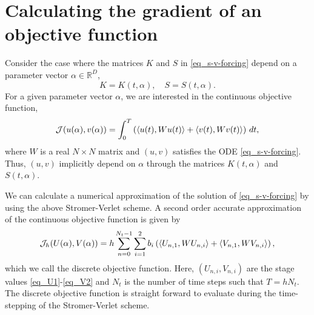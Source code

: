 \documentclass[11pt]{article}
\begin{document}
\section{Calculating the gradient of an objective function}

Consider the case where the matrices $K$ and $S$ in \eqref{eq_s-v-forcing} depend on a parameter
vector $\alpha \in {\mathbb R}^D$,
\[
K = K(t,\alpha),\quad S = S(t,\alpha).
\]
For a given parameter vector $\alpha$, we are interested in the continuous objective function,
\[
{\cal J}(u(\alpha), v(\alpha)) = \int_{0}^T \left( \langle u(t),W u(t) \rangle +  \langle v(t),W v(t) \rangle\right)\, dt,
\]
where $W$ is a real $N\times N$ matrix and $(u,v)$ satisfies the ODE \eqref{eq_s-v-forcing}. Thus, $(u,v)$ implicitly depend on $\alpha$
through the matrices $K(t,\alpha)$ and $S(t,\alpha)$.

We can calculate a numerical approximation of the solution of \eqref{eq_s-v-forcing} by
using the above Stromer-Verlet scheme. A second order accurate approximation of the continuous
objective function is given by
\begin{equation}\label{eq_discrete_obj}
  {\cal J}_h(U(\alpha), V(\alpha)) = h \sum_{n=0}^{N_t-1} \sum_{i=1}^2 b_i \left( \langle U_{n,1}, W U_{n,i}\rangle +
  \langle V_{n,1}, W V_{n,i}\rangle \right),
\end{equation}
which we call the discrete objective function. Here, $(U_{n,i}, V_{n,i})$ are the stage values
\eqref{eq_U1}-\eqref{eq_V2} and $N_t$ is the number of time steps such that $T=h N_t$.
The discrete objective function is straight forward to evaluate during the time-stepping of the
Stromer-Verlet scheme.
\end{document}
